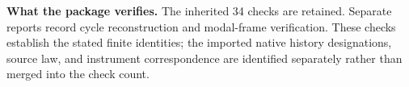 \medskip
\noindent\textbf{What the package verifies.} The inherited 34 checks are retained. Separate reports record cycle reconstruction and modal-frame verification. These checks establish the stated finite identities; the imported native history designations, source law, and instrument correspondence are identified separately rather than merged into the check count.
